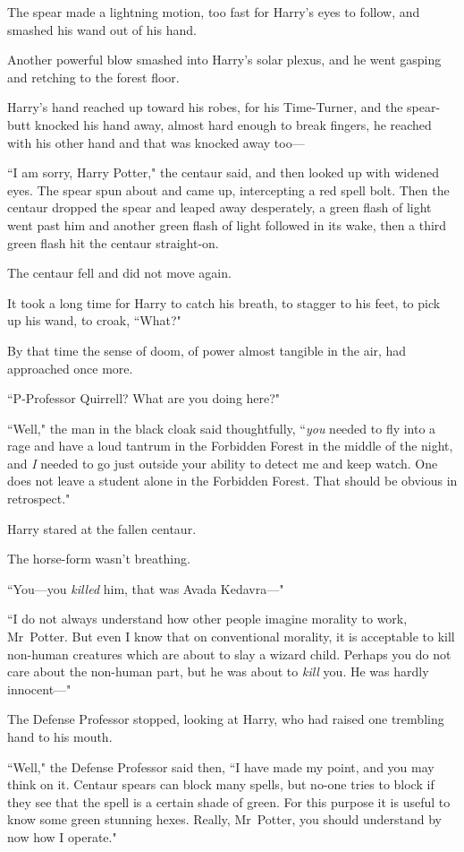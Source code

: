 The spear made a lightning motion, too fast for Harry's eyes to follow, and smashed his wand out of his hand.

Another powerful blow smashed into Harry's solar plexus, and he went gasping and retching to the forest floor.

Harry's hand reached up toward his robes, for his Time-Turner, and the spear-butt knocked his hand away, almost hard enough to break fingers, he reached with his other hand and that was knocked away too—

``I am sorry, Harry Potter," the centaur said, and then looked up with widened eyes. The spear spun about and came up, intercepting a red spell bolt. Then the centaur dropped the spear and leaped away desperately, a green flash of light went past him and another green flash of light followed in its wake, then a third green flash hit the centaur straight-on.

The centaur fell and did not move again.

It took a long time for Harry to catch his breath, to stagger to his feet, to pick up his wand, to croak, ``What?"

By that time the sense of doom, of power almost tangible in the air, had approached once more.

``P-Professor Quirrell? What are you doing here?"

``Well," the man in the black cloak said thoughtfully, ``\emph{you} needed to fly into a rage and have a loud tantrum in the Forbidden Forest in the middle of the night, and \emph{I} needed to go just outside your ability to detect me and keep watch. One does not leave a student alone in the Forbidden Forest. That should be obvious in retrospect."

Harry stared at the fallen centaur.

The horse-form wasn't breathing.

``You—you \emph{killed} him, that was Avada Kedavra—"

``I do not always understand how other people imagine morality to work, Mr~Potter. But even I know that on conventional morality, it is acceptable to kill non-human creatures which are about to slay a wizard child. Perhaps you do not care about the non-human part, but he was about to \emph{kill} you. He was hardly innocent—"

The Defense Professor stopped, looking at Harry, who had raised one trembling hand to his mouth.

``Well," the Defense Professor said then, ``I have made my point, and you may think on it. Centaur spears can block many spells, but no-one tries to block if they see that the spell is a certain shade of green. For this purpose it is useful to know some green stunning hexes. Really, Mr~Potter, you should understand by now how I operate."


